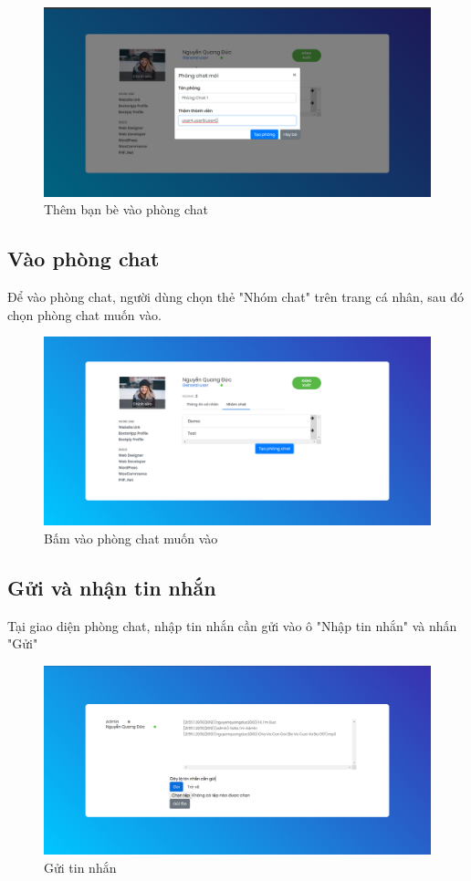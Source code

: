\documentclass[a4paper]{article}
\begin{document}
	\begin{figure}[H]
		\centering
		\includegraphics[scale=0.36]{add_user.png}
		\caption{Thêm bạn bè vào phòng chat}
		\label{F:add_user}
	\end{figure}
	
	\subsection{Vào phòng chat}
	Để vào phòng chat, người dùng chọn thẻ "Nhóm chat" trên trang cá nhân, sau đó chọn phòng chat muốn vào.
	
	\begin{figure}[H]
		\centering
		\includegraphics[scale=0.36]{view_room.png}
		\caption{Bấm vào phòng chat muốn vào}
		\label{F:view_room}
	\end{figure}
	
	\subsection{Gửi và nhận tin nhắn}
	Tại giao diện phòng chat, nhập tin nhắn cần gửi vào ô "Nhập tin nhắn" và nhấn "Gửi"
	
	\begin{figure}[H]
		\centering
		\includegraphics[scale=0.36]{send_message.png}
		\caption{Gửi tin nhắn}
		\label{F:send_message}
	\end{figure}
	
\end{document}
